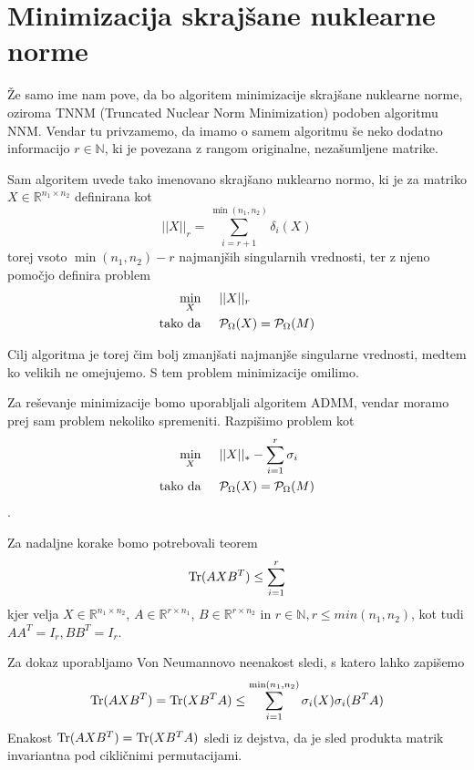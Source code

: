 \section{Minimizacija skrajšane nuklearne norme}
Že samo ime nam pove, da bo algoritem minimizacije skrajšane nuklearne norme, oziroma TNNM (Truncated Nuclear Norm Minimization) podoben algoritmu NNM. Vendar tu privzamemo, da imamo o samem algoritmu še neko dodatno informacijo $r \in \mathbb{N}$, ki je povezana z rangom originalne, nezašumljene matrike.

Sam algoritem uvede tako imenovano skrajšano nuklearno normo, ki je za matriko $X \in \mathbb{R}^{n_1 \times n_2}$ definirana kot
\[
    ||X||_r = \sum^{\min(n_1, n_2)}_{i = r + 1} \delta_i(X)
\] torej vsoto $\min(n_1,n_2) - r$ najmanjših singularnih vrednosti, ter z 
njeno pomočjo definira problem \cite{HZYLH12}
\begin{align*}
    \min_X & \hspace{0.5cm} ||X||_r \\
    \textrm{tako da} & \hspace{0.5cm} \mathcal{P}_\Omega(X) = \mathcal{P}_\Omega(M)
\end{align*}


Cilj algoritma je torej čim bolj zmanjšati najmanjše singularne vrednosti, medtem ko velikih ne omejujemo. S tem problem minimizacije omilimo.

Za reševanje minimizacije bomo uporabljali algoritem ADMM, vendar moramo prej sam problem nekoliko spremeniti. Razpišimo problem kot 
\begin{align*}
    \min_X & \hspace{0.5cm} ||X||_* - \sum_{i=1}^{r} \sigma_i \\
    \textrm{tako da} & \hspace{0.5cm} \mathcal{P}_\Omega(X) = \mathcal{P}_\Omega(M)
\end{align*}.

Za nadaljne korake bomo potrebovali teorem
\[
    \text{Tr}(AXB^T) \leq \sum_{i=1}^{r}
\]
kjer velja $X \in \mathbb{R}^{n_1 \times n_2}$, $A \in \mathbb{R}^{r \times n_1}$, $B \in \mathbb{R}^{r \times n_2}$ in $r \in \mathbb{N}, r \leq min(n_1, n_2)$, kot tudi $AA^T = I_{r}, BB^T = I_{r}$.

Za dokaz uporabljamo Von Neumannovo neenakost sledi, s katero lahko zapišemo 
\[
    \text{Tr}(AXB^T) = \text{Tr}(XB^TA) \leq \sum^{\min(n_1, n_2)}_{i=1} \sigma_i(X) \sigma_i(B^TA)
\]
Enakost $\text{Tr}(AXB^T) = \text{Tr}(XB^TA)$ sledi iz dejstva, da je sled produkta matrik invariantna pod cikličnimi permutacijami.

